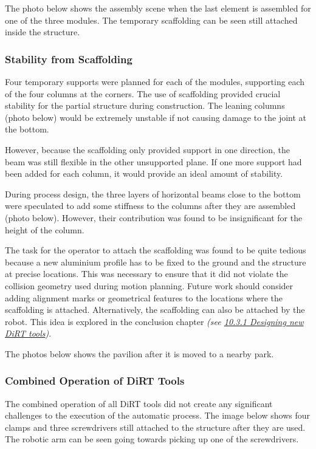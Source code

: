 The photo below shows the assembly scene when the last element is assembled for one of the three modules. The temporary scaffolding can be seen still attached inside the structure. 




\subsubsection{Stability from Scaffolding}

Four temporary supports were planned for each of the modules, supporting each of the four columns at the corners. The use of scaffolding provided crucial stability for the partial structure during construction. The leaning columns (photo below) would be extremely unstable if not causing damage to the joint at the bottom. 

However, because the scaffolding only provided support in one direction, the beam was still flexible in the other unsupported plane. If one more support had been added for each column, it would provide an ideal amount of stability. 

During process design, the three layers of horizontal beams close to the bottom were speculated to add some stiffness to the columns after they are assembled (photo below). However, their contribution was found to be insignificant for the height of the column. 




The task for the operator to attach the scaffolding was found to be quite tedious because a new aluminium profile has to be fixed to the ground and the structure at precise locations. This was necessary to ensure that it did not violate the collision geometry used during motion planning. Future work should consider adding alignment  marks or geometrical features to the locations where the scaffolding is attached. Alternatively, the scaffolding can also be attached by the robot. This idea is explored in the conclusion chapter \textit{(see \ul{10.3.1 Designing new DiRT tools})}.

The photos below shows the pavilion after it is moved to a nearby park.




\subsubsection{Combined Operation of DiRT Tools}

The combined operation of all DiRT tools did not create any significant challenges to the execution of the automatic process. The image below shows four clamps and three screwdrivers still attached to the structure after they are used. The robotic arm can be seen going towards picking up one of the screwdrivers.

